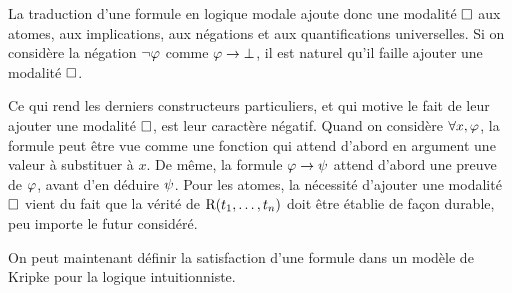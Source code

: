 La traduction d'une formule en logique modale ajoute donc une modalité
$\mathbin{\square}$ aux atomes, aux implications, aux négations et aux quantifications
universelles. Si on considère la négation $\lnot\varphi$ comme $\varphi\to\bot$,
il est naturel qu'il faille ajouter une modalité $\mathbin{\square}$.

Ce qui rend les derniers constructeurs particuliers, et qui motive le fait de
leur ajouter une modalité $\mathbin{\square}$, est leur caractère négatif. Quand on
considère $\forall x, \varphi$, la formule peut être vue comme une fonction qui
attend d'abord en argument une valeur à substituer à $x$. De même, la formule
$\varphi \to \psi$ attend d'abord une preuve de $\varphi$, avant d'en déduire
$\psi$. Pour les atomes, la nécessité d'ajouter une modalité $\mathbin{\square}$ vient du
fait que la vérité de $\mathrm{R}(t_1,\ldots,t_n)$ doit être établie de
façon durable, peu importe le futur considéré.

On peut maintenant définir la satisfaction d'une formule dans un modèle de
Kripke pour la logique intuitionniste.

